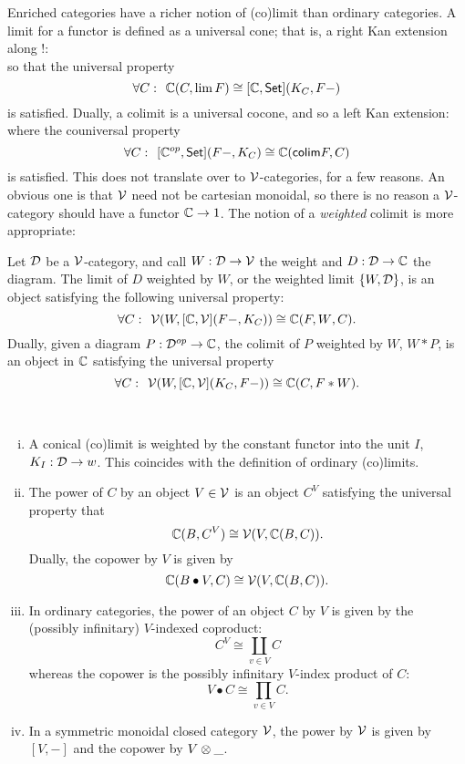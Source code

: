 Enriched categories have a richer notion of (co)limit than ordinary categories.
A limit for a functor is defined as a universal cone; that is, a right Kan extension along $!$:
\[\]
so that the universal property
\[
    \forall C:
    \hspace{0.15cm}
    \mathbb{C}(C, \lim F) \cong [\mathbb{C},\mathsf{Set}](K_C, F-)
\]
is satisfied.
Dually, a colimit is a universal cocone, and so a left Kan extension:
\[\]
where the couniversal property
\[
    \forall C:
    \hspace{0.15cm}
    [\mathbb{C}^{op},\mathsf{Set}](F-, K_C) \cong \mathbb{C}(\mathsf{colim}F, C) 
\]
is satisfied.
This does not translate over to $\mathcal{V}$-categories, for a few reasons. 
An obvious one is that $\mathcal{V}$ need not be cartesian monoidal, so there is no reason a $\mathcal{V}$-category should have a functor $\mathbb{C} \to 1$.
The notion of a \emph{weighted} colimit is more appropriate:
\begin{definition}
	Let $\mathcal{D}$ be a $\mathcal{V}$-category, and call $W: \mathcal{D} \to \mathcal{V}$ the weight and $D: \mathcal{D} \to \mathbb{C}$ the diagram.
	The limit of $D$ weighted by $W$, or the weighted limit $\{ W, \mathcal{D} \}$, is an object satisfying the following universal property:
	\[
        \forall C: \hspace{0.15cm} \mathcal{V}(W, [\mathbb{C},\mathcal{V}](F-, K_C)) \cong \mathbb{C}({F,W}, C).
	\]
	Dually, given a diagram $P: \mathcal{D}^{op} \to \mathbb{C}$, the colimit of $P$ weighted by $W$, $W*P$, is an object in $\mathbb{C}$ satisfying the universal property
	\[
        \forall C: \hspace{0.15cm}  \mathcal{V}(W, [\mathbb{C},\mathcal{V}](K_C, F-)) \cong \mathbb{C}(C, F*W ).
	\]
\end{definition}
\begin{example}
	~\begin{enumerate}[(i)]
		\item A conical (co)limit is weighted by the constant functor into the unit $I$, $K_I: \mathcal{D} \to w$.
		This coincides with the definition of ordinary (co)limits.
		\item The power of $C$ by an object $V \in \mathcal{V}$ is an object $C^V$ satisfying the universal property that
		\[
			\mathbb{C}(B, C^V) \cong \mathcal{V}(V, \mathbb{C}(B,C)).
		\]
		Dually, the copower by $V$ is given by 
		\[
			\mathbb{C}(B\bullet V, C) \cong \mathcal{V}(V, \mathbb{C}(B, C)). 
		\]
		\item In ordinary categories, the power of an object $C$ by $V$ is given by the (possibly infinitary) $V$-indexed coproduct:
		\[
			C^V \cong \coprod_{v\in V} C	
		\]
		whereas the copower is the possibly infinitary $V$-index product of $C$:
		\[
			V\bullet C \cong \prod_{v \in V} C.
		\]
		\item In a symmetric monoidal closed category $\mathcal{V}$, the power by $\mathcal{V}$ is given by $[V,-]$ and the copower by $V \otimes \_$.
	\end{enumerate}
\end{example}

